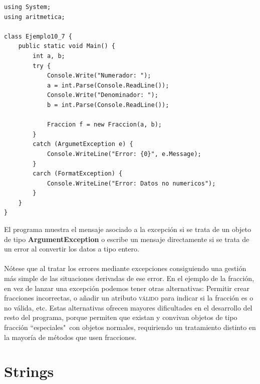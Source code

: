 \documentclass[12pt,a4paper]{report}
\begin{document}
\begin{lstlisting}
using System;
using aritmetica;

class Ejemplo10_7 {
	public static void Main() {
		int a, b;
		try {
			Console.Write("Numerador: ");
			a = int.Parse(Console.ReadLine());
			Console.Write("Denominador: ");
			b = int.Parse(Console.ReadLine());
			
			Fraccion f = new Fraccion(a, b);		
		}
		catch (ArgumetException e) {
			Console.WriteLine("Error: {0}", e.Message);		
		}
		carch (FormatException) {
			Console.WriteLine("Error: Datos no numericos");		
		}
	}
}
\end{lstlisting}El programa muestra el mensaje asociado a la excepción si se trata de un objeto de tipo \textbf{ArgumentException} o escribe un mensaje directamente si se trata de un error al convertir los datos a tipo entero.\\\\Nótese que al tratar los errores mediante excepciones consiguiendo una gestión más simple de las situaciones derivadas de ese error. En el ejemplo de la fracción, en vez de lanzar una excepción podemos tener otras alternativas: Permitir crear fracciones incorrectas, o añadir un atributo \textsc{válido} para indicar si la fracción es o no válida, etc. Estas alternativas ofrecen mayores dificultades en el desarrollo del resto del programa, porque permiten que existan y convivan objetos de tipo fracción ``especiales"\ con objetos normales, requiriendo un tratamiento distinto en la mayoría de métodos que usen fracciones. 
\chapter{Strings}
\end{document}
